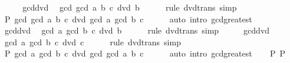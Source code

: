 \begin{isabellebody}
\ \ \isamarkupfalse%
\ \isamarkupfalse%
\ gcd{\isacharunderscore}{\kern0pt}dvd{}\ \isamarkupfalse%
\ {\isachardoublequoteopen}gcd\ {\isacharparenleft}{\kern0pt}gcd\ a\ b{\isacharparenright}{\kern0pt}\ c\ dvd\ b{\isachardoublequoteclose}\isanewline
\ \ \ \ \isamarkupfalse%
\ {\isacharparenleft}{\kern0pt}rule\ dvd{\isacharunderscore}{\kern0pt}trans{\isacharparenright}{\kern0pt}\ simp\isanewline
\ \ \isamarkupfalse%
\ \isamarkupfalse%
\ P{}{\isacharcolon}{\kern0pt}\ {\isachardoublequoteopen}gcd\ {\isacharparenleft}{\kern0pt}gcd\ a\ b{\isacharparenright}{\kern0pt}\ c\ dvd\ gcd\ a\ {\isacharparenleft}{\kern0pt}gcd\ b\ c{\isacharparenright}{\kern0pt}{\isachardoublequoteclose}\isanewline
\ \ \ \ \isamarkupfalse%
\ {\isacharparenleft}{\kern0pt}auto\ intro{\isacharbang}{\kern0pt}{\isacharcolon}{\kern0pt}\ gcd{\isacharunderscore}{\kern0pt}greatest{\isacharparenright}{\kern0pt}\isanewline
\ \ \isamarkupfalse%
\ gcd{\isacharunderscore}{\kern0pt}dvd{}\ \isamarkupfalse%
\ {\isachardoublequoteopen}gcd\ a\ {\isacharparenleft}{\kern0pt}gcd\ b\ c{\isacharparenright}{\kern0pt}\ dvd\ b{\isachardoublequoteclose}\isanewline
\ \ \ \ \isamarkupfalse%
\ {\isacharparenleft}{\kern0pt}rule\ dvd{\isacharunderscore}{\kern0pt}trans{\isacharparenright}{\kern0pt}\ simp\isanewline
\ \ \isamarkupfalse%
\ \isamarkupfalse%
\ gcd{\isacharunderscore}{\kern0pt}dvd{}\ \isamarkupfalse%
\ {\isachardoublequoteopen}gcd\ a\ {\isacharparenleft}{\kern0pt}gcd\ b\ c{\isacharparenright}{\kern0pt}\ dvd\ c{\isachardoublequoteclose}\isanewline
\ \ \ \ \isamarkupfalse%
\ {\isacharparenleft}{\kern0pt}rule\ dvd{\isacharunderscore}{\kern0pt}trans{\isacharparenright}{\kern0pt}\ simp\isanewline
\ \ \isamarkupfalse%
\ \isamarkupfalse%
\ P{}{\isacharcolon}{\kern0pt}\ {\isachardoublequoteopen}gcd\ a\ {\isacharparenleft}{\kern0pt}gcd\ b\ c{\isacharparenright}{\kern0pt}\ dvd\ gcd\ {\isacharparenleft}{\kern0pt}gcd\ a\ b{\isacharparenright}{\kern0pt}\ c{\isachardoublequoteclose}\isanewline
\ \ \ \ \isamarkupfalse%
\ {\isacharparenleft}{\kern0pt}auto\ intro{\isacharbang}{\kern0pt}{\isacharcolon}{\kern0pt}\ gcd{\isacharunderscore}{\kern0pt}greatest{\isacharparenright}{\kern0pt}\isanewline
\ \ \isamarkupfalse%
\ P{}\ P{}\ \isamarkupfalse%

\end{isabellebody}
